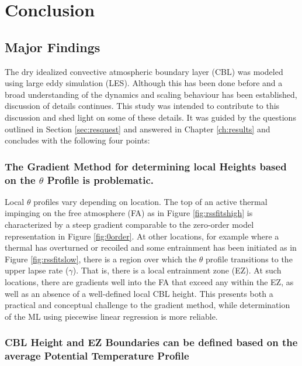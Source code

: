 
\chapter{Conclusion}
\label{ch:conc}
\setlength{\parindent}{0cm}

\section{Major Findings}

The dry idealized convective atmospheric boundary layer (\acs{CBL}) was modeled using large eddy simulation (\acs{LES}).  Although this has been done before and a broad understanding of the dynamics and scaling behaviour has been established, discussion of details continues.  This study was intended to contribute to this discussion and shed light on some of these details.  It was guided by the questions outlined in Section \ref{sec:resquest} and answered in Chapter \ref{ch:results} and concludes with the following four points:    


\subsection{The Gradient Method for determining local Heights based on the $\theta$ Profile is problematic.}

Local $\theta$ profiles vary depending on location.  The top of an active thermal impinging on the free atmosphere (\acs{FA}) as in Figure \ref{fig:rssfitshigh} is characterized by a steep gradient comparable to the zero-order model representation in Figure \ref{fig:0order}.  At other locations, for example where a thermal has overturned or recoiled and some entrainment has been initiated as in Figure \ref{fig:rssfitslow}, there is a region over which the $\theta$ profile transitions to the upper lapse rate ($\gamma$). That is, there is a local entrainment zone (\acs{EZ}).  At such locations, there are gradients well into the \acs{FA} that exceed any within the \acs{EZ}, as well as an absence of a well-defined local \acs{CBL} height.  This presents both a practical and conceptual challenge to the gradient method, while determination of the \acs{ML} using piecewise linear regression is more reliable. 

\subsection{\acs{CBL} Height and \acs{EZ} Boundaries can be defined based on the average Potential Temperature Profile}

